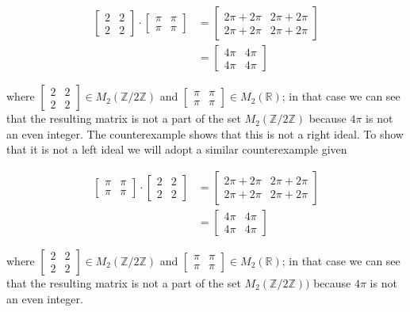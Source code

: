 \documentclass{article}
\begin{document}
        \[
          \begin{split}
            \begin{bmatrix}2 & 2 \\ 2 & 2\end{bmatrix} \cdot \begin{bmatrix}\pi & \pi \\ \pi & \pi\end{bmatrix} &= \begin{bmatrix}2\pi + 2\pi & 2\pi + 2\pi \\ 2\pi + 2\pi & 2\pi + 2\pi\end{bmatrix}\\
            &= \begin{bmatrix}4\pi & 4\pi \\ 4\pi & 4\pi \end{bmatrix}
          \end{split}
        \]

        \noindent where $\begin{bmatrix}2 & 2 \\ 2 & 2\end{bmatrix} \in M_2(\mathbb{Z}/2\mathbb{Z})$ and $\begin{bmatrix}\pi & \pi \\ \pi & \pi\end{bmatrix} \in M_2(\mathbb{R})$; in that case we can see that the resulting matrix is not a part of the set $M_2(\mathbb{Z}/2\mathbb{Z})$ because $4\pi$ is not an even integer. The counterexample shows that this is not a right ideal. To show that it is not a left ideal we will adopt a similar counterexample given

          \[
            \begin{split}
              \begin{bmatrix}\pi & \pi \\ \pi & \pi\end{bmatrix} \cdot \begin{bmatrix}2 & 2 \\ 2 & 2\end{bmatrix}  &= \begin{bmatrix}2\pi + 2\pi & 2\pi + 2\pi \\ 2\pi + 2\pi & 2\pi + 2\pi\end{bmatrix}\\
              &= \begin{bmatrix}4\pi & 4\pi \\ 4\pi & 4\pi \end{bmatrix}
            \end{split}
          \]

        \noindent where $\begin{bmatrix}2 & 2 \\ 2 & 2\end{bmatrix} \in M_2(\mathbb{Z}/2\mathbb{Z})$ and $\begin{bmatrix}\pi & \pi \\ \pi & \pi\end{bmatrix} \in M_2(\mathbb{R})$; in that case we can see that the resulting matrix is not a part of the set $M_2(\mathbb{Z}/2\mathbb{Z}))$ because $4\pi$ is not an even integer.

    
\end{document}
